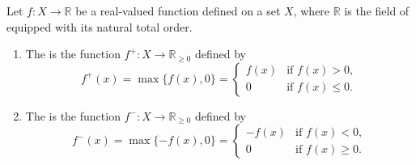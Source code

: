 \begin{definition} \label{definition:positive_and_negative_parts_of_a_real_valued_function_on_a_set}
Let $f : X \to \mathbb{R}$ be a real-valued function defined on a set $X$, where $\mathbb{R}$ is the field of  equipped with its natural total order.

\begin{enumerate}
    \item The  is the function $f^+ : X \to \mathbb{R}_{\geq 0}$ defined by
    $$f^+(x) = \max\{f(x), 0\} = \begin{cases} f(x) & \text{if } f(x) > 0, \\ 0 & \text{if } f(x) \leq 0. \end{cases}$$

    \item The  is the function $f^- : X \to \mathbb{R}_{\geq 0}$ defined by
    $$f^-(x) = \max\{-f(x), 0\} = \begin{cases} -f(x) & \text{if } f(x) < 0, \\ 0 & \text{if } f(x) \geq 0. \end{cases}$$
\end{enumerate}
\end{definition}